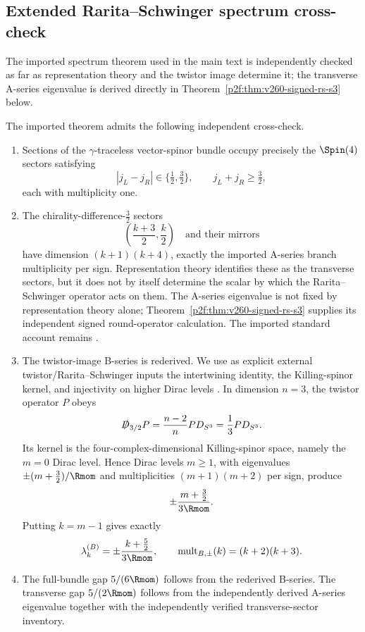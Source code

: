 \documentclass[11pt,a4paper]{article}
\begin{document}
\subsection{Extended Rarita--Schwinger spectrum cross-check}
\label{p2d:app:rs-crosscheck}
The imported spectrum theorem used in the main text is independently checked
as far as representation theory and the twistor image determine it; the
transverse A-series eigenvalue is derived directly in
Theorem~\ref{p2f:thm:v260-signed-rs-s3} below.

\begin{proposition}
\label{p2:prop:rs-spectrum-cross-check}
The imported theorem admits the following independent cross-check.
\begin{enumerate}[label=(\roman*), leftmargin=2em]
\item Sections of the \(\gamma\)-traceless vector-spinor bundle occupy
precisely the \(\Spin(4)\) sectors satisfying
\[
 |j_L-j_R|\in\{\tfrac12,\tfrac32\},
 \qquad
 j_L+j_R\ge\tfrac32,
\]
each with multiplicity one.
\item The chirality-difference-\(\tfrac32\) sectors
\[
\left(\frac{k+3}{2},\frac{k}{2}\right)
\quad\text{and their mirrors}
\]
have dimension \((k+1)(k+4)\), exactly the imported A-series
branch multiplicity per sign.  Representation theory identifies these as the
transverse sectors, but it does not by itself determine the scalar by which
the Rarita--Schwinger operator acts on them.  The A-series eigenvalue is not fixed by representation theory alone;
Theorem~\ref{p2f:thm:v260-signed-rs-s3} supplies its independent
signed round-operator calculation. The imported standard account remains
\cite{HommaTomihisa2020RaritaSchwinger}.
\item The twistor-image B-series is rederived.  We use as explicit external
twistor/Rarita--Schwinger inputs the intertwining identity, the
Killing-spinor kernel, and injectivity on higher Dirac levels
\cite{Bures1999HigherSpinDirac,HommaTomihisa2020RaritaSchwinger}.  In
dimension \(n=3\), the twistor operator \(P\) obeys
\[
\slashed D_{3/2}P
=\frac{n-2}{n}PD_{S^3}
=\frac13PD_{S^3}.
\]
Its kernel is the four-complex-dimensional Killing-spinor space, namely the
\(m=0\) Dirac level.  Hence Dirac levels \(m\ge1\), with eigenvalues
\(\pm(m+\tfrac32)/\Rmom\) and multiplicities \((m+1)(m+2)\) per sign,
produce
\[
\pm\frac{m+\tfrac32}{3\Rmom}.
\]
Putting \(k=m-1\) gives exactly
\[
\lambda_k^{(B)}
=\pm\frac{k+\tfrac52}{3\Rmom},
\qquad
\operatorname{mult}_{B,\pm}(k)=(k+2)(k+3).
\]
\item The full-bundle gap \(5/(6\Rmom)\) follows from the rederived B-series.
The transverse gap \(5/(2\Rmom)\) follows from the independently derived A-series
eigenvalue together with the independently verified transverse-sector
inventory.
\end{enumerate}
\end{proposition}
\end{document}
